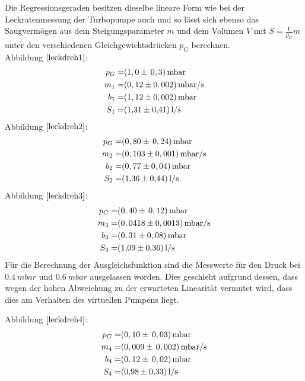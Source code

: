 Die Regressionsgeraden besitzen dieselbe lineare Form wie bei der Leckratenmessung der Turbopumpe auch und so lässt sich ebenso das Saugvermögen
aus dem Steigungsparameter $m$ und dem Volumen $V$ mit $S=\frac{V}{p_G}m$ unter den verschiedenen Gleichgewichtsdrücken $p_G$ berechnen.\\
Abbildung $\ref{leckdreh1}$:
	\begin{align*}
		p_G=& (1,0 \pm \, 0,3)  \, \si{mbar}\\
		m_1=& (0,12 \pm 0,002) \, \si{mbar/s}\\
		b_1=& (1,12 \pm 0,002) \, \si{mbar}\\
		S_1=& \SI{1,31 \pm 0,41}{l/s}
	\end{align*}
	Abbildung $\ref{leckdreh2}$:
		\begin{align*}
			p_G=& (0,80 \pm \, 0,24) \, \si{mbar}\\
			m_2=& (0,103 \pm 0,001) \, \si{mbar/s}\\
			b_2=& (0,77 \pm 0,04) \, \si{mbar}\\
			S_2=& \SI{1,36 \pm 0,44}{l/s}
		\end{align*}
		Abbildung $\ref{leckdreh3}$:
			\begin{align*}
				p_G=& (0,40 \pm \, 0,12) \, \si{mbar}\\
				m_3=& (0,0418 \pm 0,0013)\, \si{mbar/s}\\
				b_3=& (0,31 \pm 0,08) \, \si{mbar}\\
				S_3=& \SI{1,09 \pm 0,36}{l/s}
			\end{align*}
		Für die Berechnung der Ausgleichsfunktion sind die Messwerte für den Druck bei $\SI{0,4}{mbar}$ und $\SI{0,6}{mbar}$ ausgelassen worden.
		Dies geschieht aufgrund dessen, dass wegen der hohen Abweichung zu der erwarteten Linearität vermutet wird,
		 dass dies am Verhalten des virtuellen Pumpens liegt.

		Abbildung $\ref{leckdreh4}$:
			\begin{align*}
				p_G=& (0,10 \pm \, 0,03) \, \si{mbar}\\
				m_4=& (0,009 \pm \, 0,002) \, \si{mbar/s}\\
				b_4=& (0,12 \pm \, 0,02) \, \si{mbar}\\
				S_4=& \SI{0,98 \pm 0,33}{l/s}
			\end{align*}
			\newpage
